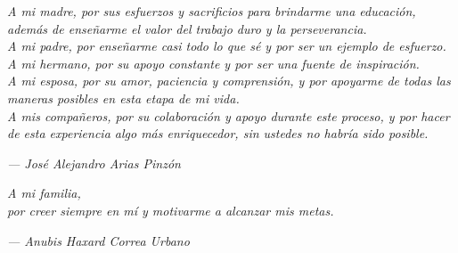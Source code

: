 \cleardoublepage{}
\thispagestyle{empty}

\vspace*{4cm}

\begin{center}
\textit{
    A mi madre, por sus esfuerzos y sacrificios para brindarme una educación, además de enseñarme el valor del trabajo duro y la perseverancia. \\
    A mi padre, por enseñarme casi todo lo que sé y por ser un ejemplo de esfuerzo. \\
    A mi hermano, por su apoyo constante y por ser una fuente de inspiración.\\
    A mi esposa, por su amor, paciencia y comprensión, y por apoyarme de todas las maneras posibles en esta etapa de mi vida.\\
    A mis compañeros, por su colaboración y apoyo durante este proceso, y por hacer de esta experiencia algo más enriquecedor, sin ustedes no habría sido posible.\\
}

\vspace{2cm}

\hfill \textit{--- José Alejandro Arias Pinzón}

\vspace{3cm}

\textit{
A mi familia,\\
por creer siempre en mí y motivarme a alcanzar mis metas.
}

\vspace{2cm}

\hfill \textit{--- Anubis Haxard Correa Urbano}
\end{center}
